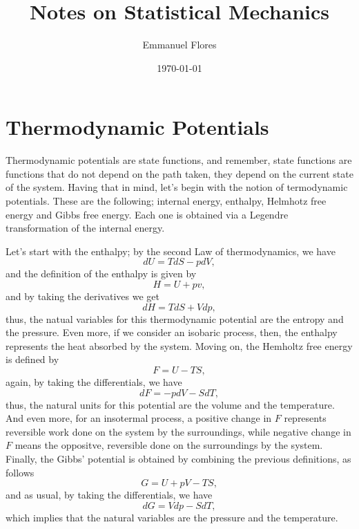 \documentclass{article}
\title{Notes on Statistical Mechanics}
\author{Emmanuel Flores}
\date{\today}
\begin{document}
\maketitle

\section{Thermodynamic Potentials}
Thermodynamic potentials are state functions, and remember, state functions are functions that do not depend on the path taken, they depend on the current state of the system. Having that in mind, let's begin with the notion of termodynamic potentials. These are the following; internal energy, enthalpy, Helmhotz free energy and Gibbs free energy. Each one is obtained via a Legendre transformation of the internal energy.

Let's start with the enthalpy; by the second Law of thermodynamics, we have
\begin{displaymath}
  dU = TdS-pdV,
\end{displaymath}
and the definition of the enthalpy is given by
\begin{displaymath}
  H = U + pv,
\end{displaymath}
and by taking the derivatives we get
\begin{displaymath}
  dH = TdS + Vdp,
\end{displaymath}
thus, the natual variables for this thermodynamic potential are the entropy and the pressure. Even more, if we consider an isobaric process, then, the enthalpy represents the heat absorbed by the system.
Moving on, the Hemholtz free energy is defined by 
\begin{displaymath}
  F = U - TS,
\end{displaymath}
again, by taking the differentials, we have
\begin{displaymath}
  dF = -pdV-SdT,
\end{displaymath}
thus, the natural units for this potential are the volume and the temperature. And even more, for an insotermal process, a positive change in $F$ represents reversible work done on the system by the surroundings, while negative change in $F$ means the oppositve, reversible done on the surroundings by the system.
Finally, the Gibbs' potential is obtained by combining the previous definitions, as follows
\begin{displaymath}
  G = U + pV - TS,
\end{displaymath}
and as usual, by taking the differentials, we have
\begin{displaymath}
  dG = Vdp - SdT,
\end{displaymath}
which implies that the natural variables are the pressure and the temperature.
\end{document}
